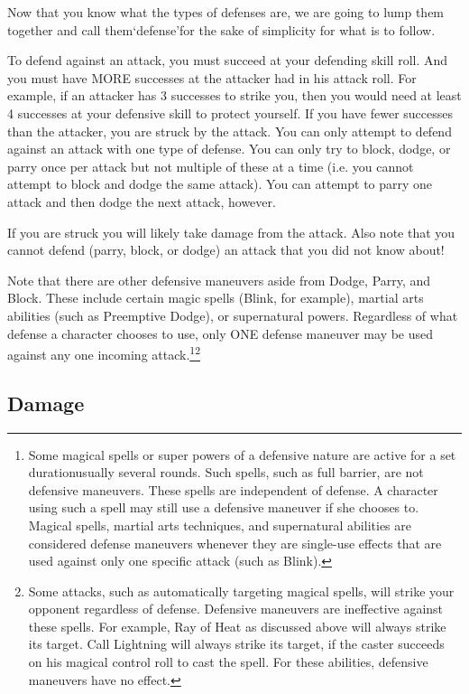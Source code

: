 \documentclass[twoside]{book}
\begin{document}
    {  
    Now that you know what the types of defenses are, we are going to lump them together and call them`defense'for the sake of simplicity for what is to follow.
    }
  
    {  
    To defend against an attack, you must succeed at your defending skill roll. And you must have MORE successes at the attacker had in his attack roll. For example, if an attacker has 3 successes to strike you, then you would need at least 4 successes at your defensive skill to protect yourself. If you have fewer successes than the attacker, you are struck by the attack. You can only attempt to defend against an attack with one type of defense. You can only try to block, dodge, or parry once per attack but not multiple of these at a time (i.e. you cannot attempt to block and dodge the same attack). You can attempt to parry one attack and then dodge the next attack, however.
    }
  
    {  
    If you are struck you will likely take damage from the attack. Also note that you cannot defend (parry, block, or dodge) an attack that you did not know about!
    }
  
    {  
    Note that there are other defensive maneuvers aside from Dodge, Parry, and Block. These include certain magic spells (Blink, for example), martial arts abilities (such as Preemptive Dodge), or supernatural powers. Regardless of what defense a character chooses to use, only ONE defense maneuver may be used against any one incoming attack.\footnote{Some magical spells or super powers of a defensive nature are active for a set durationusually several rounds. Such spells, such as full barrier, are not defensive maneuvers. These spells are independent of defense. A character using such a spell may still use a defensive maneuver if she chooses to. Magical spells, martial arts techniques, and supernatural abilities are considered defense maneuvers whenever they are single-use effects that are used against only one specific attack (such as Blink).}\footnote{Some attacks, such as automatically targeting magical spells, will strike your opponent regardless of defense. Defensive maneuvers are ineffective against these spells. For example, Ray of Heat as discussed above will always strike its target. Call Lightning will always strike its target, if the caster succeeds on his magical control roll to cast the spell. For these abilities, defensive maneuvers have no effect.}
    }
  
    

\subsection{Damage}
    
\end{document}
